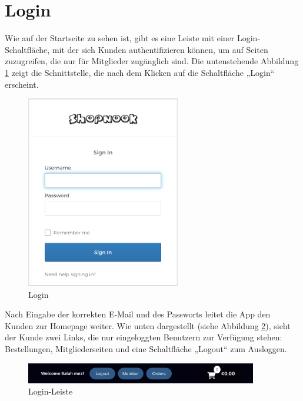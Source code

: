 \section{Login}

Wie auf der Startseite zu sehen ist, gibt es eine Leiste mit einer Login-Schaltfläche, mit der sich Kunden authentifizieren können, um auf Seiten zuzugreifen, die nur für Mitglieder zugänglich sind. Die untenstehende Abbildung  \ref{fig:sample6-image} zeigt die Schnittstelle, die nach dem Klicken auf die Schaltfläche „Login“ erscheint.

\begin{figure}[H]  
	\centering %
	\includegraphics[width=0.6\textwidth]{Images/Login.png} 
	\caption{Login} 
	\label{fig:sample6-image} 
\end{figure}


Nach Eingabe der korrekten E-Mail und des Passworts leitet die App den Kunden zur Homepage weiter. Wie unten dargestellt (siehe Abbildung \ref{fig:sample7-image}), sieht der Kunde zwei Links, die nur eingeloggten Benutzern zur Verfügung stehen: Bestellungen, Mitgliederseiten und eine Schaltfläche „Logout“ zum Ausloggen.



\begin{figure}[H]  
	\centering %
	\includegraphics[width=0.9\textwidth]{Images/Login-bar.png} 
	\caption{Login-Leiste} 
	\label{fig:sample7-image} 
\end{figure}

